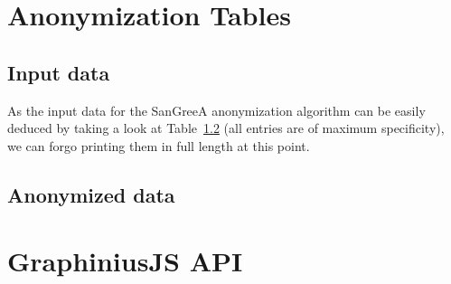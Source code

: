 
% 

\chapter{Anonymization Tables}
\label{App:AppendixA}

\section{Input data}
\label{sect:anon_input_data}

As the input data for the SanGreeA anonymization algorithm can be easily deduced by taking a look at Table~\ref{sect:anon_output_data} (all entries are of maximum specificity), we can forgo printing them in full length at this point.

\section{Anonymized data}
\label{sect:anon_output_data}

{
}

\chapter{GraphiniusJS API}
\label{App:AppendixB}

\begin{landscape}
\end{landscape}
